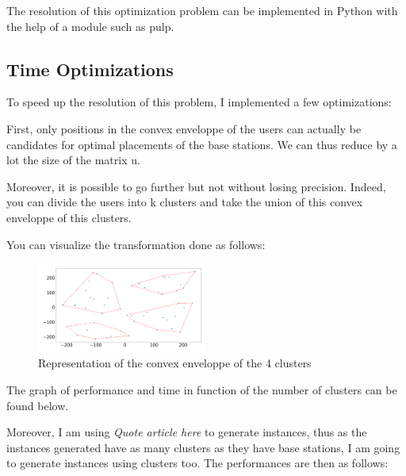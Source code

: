 \documentclass[letterpaper]{article}
\begin{document}
The resolution of this optimization problem can be implemented in Python with the help of a module such as pulp.

\subsection{Time Optimizations}

To speed up the resolution of this problem, I implemented a few optimizations:

First, only positions in the convex enveloppe of the users can actually be candidates for optimal placements of the base stations.
We can thus reduce by a lot the size of the matrix u.

Moreover, it is possible to go further but not without losing precision.
Indeed, you can divide the users into k clusters and take the union of this convex enveloppe of this clusters.

You can visualize the transformation done as follows:

\begin{figure}[H]
    \centering
    \includegraphics[width=0.5\textwidth]{images/four_cluster.png}
    \caption{Representation of the convex enveloppe of the 4 clusters}
\end{figure}

The graph of performance and time in function of the number of clusters can be found below.

Moreover, I am using \textit{Quote article here} to generate instances, thus as the instances generated have as many
clusters as they have base stations, I am going to generate instances using clusters too.
The performances are then as follows:
\end{document}
